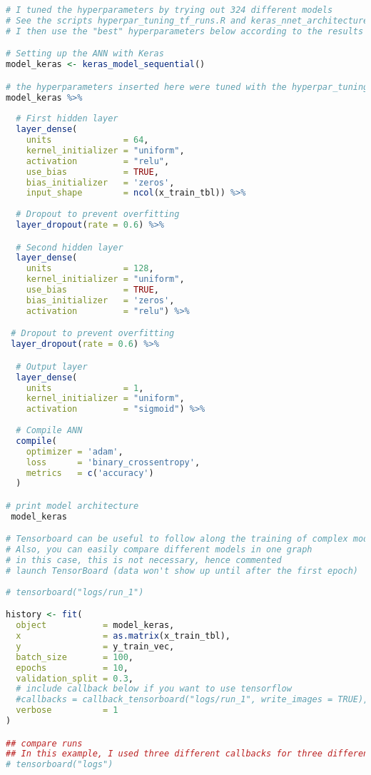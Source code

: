\begin{lstlisting}[language=R,caption={Main analysis}, label=lst_main]
# I tuned the hyperparameters by trying out 324 different models
# See the scripts hyperpar_tuning_tf_runs.R and keras_nnet_architecture
# I then use the "best" hyperparameters below according to the results of those runs

# Setting up the ANN with Keras
model_keras <- keras_model_sequential()

# the hyperparameters inserted here were tuned with the hyperpar_tuning_tf_runs.R script
model_keras %>% 
  
  # First hidden layer
  layer_dense(
    units              = 64,
    kernel_initializer = "uniform", 
    activation         = "relu", 
    use_bias           = TRUE,
    bias_initializer   = 'zeros',
    input_shape        = ncol(x_train_tbl)) %>% 
  
  # Dropout to prevent overfitting
  layer_dropout(rate = 0.6) %>%

  # Second hidden layer
  layer_dense(
    units              = 128,
    kernel_initializer = "uniform",
    use_bias           = TRUE,
    bias_initializer   = 'zeros',
    activation         = "relu") %>%

 # Dropout to prevent overfitting
 layer_dropout(rate = 0.6) %>%

  # Output layer
  layer_dense(
    units              = 1, 
    kernel_initializer = "uniform", 
    activation         = "sigmoid") %>% 
  
  # Compile ANN
  compile(
    optimizer = 'adam',
    loss      = 'binary_crossentropy',
    metrics   = c('accuracy')
  )

# print model architecture
 model_keras

# Tensorboard can be useful to follow along the training of complex models as it trains
# Also, you can easily compare different models in one graph
# in this case, this is not necessary, hence commented
# launch TensorBoard (data won't show up until after the first epoch)
 
# tensorboard("logs/run_1")

history <- fit(
  object           = model_keras, 
  x                = as.matrix(x_train_tbl), 
  y                = y_train_vec,
  batch_size       = 100, 
  epochs           = 10,
  validation_split = 0.3,
  # include callback below if you want to use tensorflow
  #callbacks = callback_tensorboard("logs/run_1", write_images = TRUE),
  verbose          = 1
)

## compare runs
## In this example, I used three different callbacks for three different model specifications
# tensorboard("logs")


\end{lstlisting}
